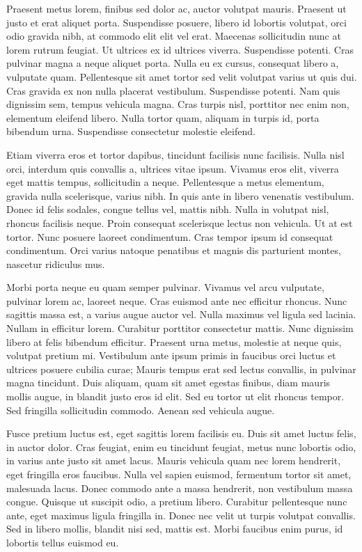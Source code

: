 Praesent metus lorem, finibus sed dolor ac, auctor volutpat mauris. Praesent ut justo et erat aliquet porta. Suspendisse posuere, libero id lobortis volutpat, orci odio gravida nibh, at commodo elit elit vel erat. Maecenas sollicitudin nunc at lorem rutrum feugiat. Ut ultrices ex id ultrices viverra. Suspendisse potenti. Cras pulvinar magna a neque aliquet porta. Nulla eu ex cursus, consequat libero a, vulputate quam. Pellentesque sit amet tortor sed velit volutpat varius ut quis dui. Cras gravida ex non nulla placerat vestibulum. Suspendisse potenti. Nam quis dignissim sem, tempus vehicula magna. Cras turpis nisl, porttitor nec enim non, elementum eleifend libero. Nulla tortor quam, aliquam in turpis id, porta bibendum urna. Suspendisse consectetur molestie eleifend.

Etiam viverra eros et tortor dapibus, tincidunt facilisis nunc facilisis. Nulla nisl orci, interdum quis convallis a, ultrices vitae ipsum. Vivamus eros elit, viverra eget mattis tempus, sollicitudin a neque. Pellentesque a metus elementum, gravida nulla scelerisque, varius nibh. In quis ante in libero venenatis vestibulum. Donec id felis sodales, congue tellus vel, mattis nibh. Nulla in volutpat nisl, rhoncus facilisis neque. Proin consequat scelerisque lectus non vehicula. Ut at est tortor. Nunc posuere laoreet condimentum. Cras tempor ipsum id consequat condimentum. Orci varius natoque penatibus et magnis dis parturient montes, nascetur ridiculus mus.

Morbi porta neque eu quam semper pulvinar. Vivamus vel arcu vulputate, pulvinar lorem ac, laoreet neque. Cras euismod ante nec efficitur rhoncus. Nunc sagittis massa est, a varius augue auctor vel. Nulla maximus vel ligula sed lacinia. Nullam in efficitur lorem. Curabitur porttitor consectetur mattis. Nunc dignissim libero at felis bibendum efficitur. Praesent urna metus, molestie at neque quis, volutpat pretium mi. Vestibulum ante ipsum primis in faucibus orci luctus et ultrices posuere cubilia curae; Mauris tempus erat sed lectus convallis, in pulvinar magna tincidunt. Duis aliquam, quam sit amet egestas finibus, diam mauris mollis augue, in blandit justo eros id elit. Sed eu tortor ut elit rhoncus tempor. Sed fringilla sollicitudin commodo. Aenean sed vehicula augue.

Fusce pretium luctus est, eget sagittis lorem facilisis eu. Duis sit amet luctus felis, in auctor dolor. Cras feugiat, enim eu tincidunt feugiat, metus nunc lobortis odio, in varius ante justo sit amet lacus. Mauris vehicula quam nec lorem hendrerit, eget fringilla eros faucibus. Nulla vel sapien euismod, fermentum tortor sit amet, malesuada lacus. Donec commodo ante a massa hendrerit, non vestibulum massa congue. Quisque ut suscipit odio, a pretium libero. Curabitur pellentesque nunc ante, eget maximus ligula fringilla in. Donec nec velit ut turpis volutpat convallis. Sed in libero mollis, blandit nisi sed, mattis est. Morbi faucibus enim purus, id lobortis tellus euismod eu.

